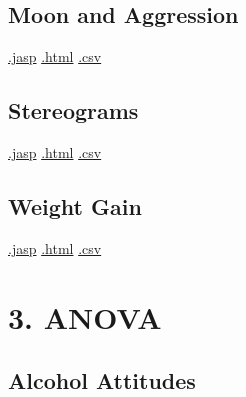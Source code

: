 \documentclass[
  letterpaper,
  DIV=11,
  numbers=noendperiod]{scrreprt}
\begin{document}
\hypertarget{moon-and-aggression}{%
\section{Moon and Aggression}\label{moon-and-aggression}}

\textbar{}
\href{https://github.com/jasp-stats/jasp-data-library/raw/main/Moon\%20and\%20Aggression/Moon\%20and\%20Aggression.jasp}{.jasp}
\textbar{}
\href{https://htmlpreview.github.io/?https://github.com/jasp-stats/jasp-data-library/blob/main/Moon\%20and\%20Aggression/index.html}{.html}
\textbar{}
\href{https://raw.githubusercontent.com/jasp-stats/jasp-data-library/main/Moon\%20and\%20Aggression/Moon\%20and\%20Aggression.csv}{.csv}

\hypertarget{stereograms}{%
\section{Stereograms}\label{stereograms}}

\textbar{}
\href{https://github.com/jasp-stats/jasp-data-library/raw/main/Stereograms/Stereograms.jasp}{.jasp}
\textbar{}
\href{https://htmlpreview.github.io/?https://github.com/jasp-stats/jasp-data-library/blob/main/Stereograms/index.html}{.html}
\textbar{}
\href{https://raw.githubusercontent.com/jasp-stats/jasp-data-library/main/Stereograms/Stereograms.csv}{.csv}

\hypertarget{weight-gain}{%
\section{Weight Gain}\label{weight-gain}}

\textbar{}
\href{https://github.com/jasp-stats/jasp-data-library/raw/main/Weight\%20Gain/Weight\%20Gain.jasp}{.jasp}
\textbar{}
\href{https://htmlpreview.github.io/?https://github.com/jasp-stats/jasp-data-library/blob/main/Weight\%20Gain/index.html}{.html}
\textbar{}
\href{https://raw.githubusercontent.com/jasp-stats/jasp-data-library/main/Weight\%20Gain/Weight\%20Gain.csv}{.csv}


\hypertarget{anova}{%
\chapter{3. ANOVA}\label{anova}}

\hypertarget{alcohol-attitudes}{%
\section{Alcohol Attitudes}\label{alcohol-attitudes}}
\end{document}
